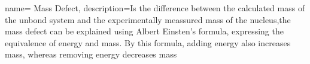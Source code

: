 {
    name= Mass Defect,
    description={Is the difference between the calculated mass of the unbond system and the experimentally meassured mass of the nucleus,the mass defect can be explained using Albert Einsten's formula, expressing the equivalence of energy and mass. By this formula, adding energy also increases mass, whereas removing energy decreases mass}
} 
